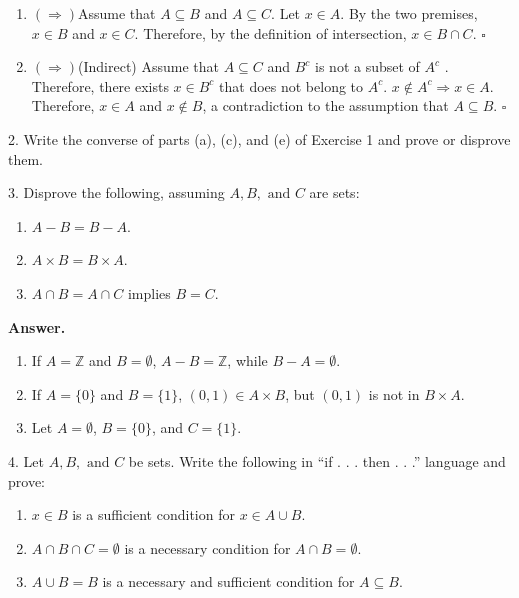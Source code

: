 \documentclass[10pt,]{book}
\theoremstyle{plain}
\theoremstyle{definition}
\theoremstyle{definition}
\theoremstyle{definition}
\begin{document}
\begin{exercisegroup}
\begin{enumerate}[label=\alph*]
\item\hypertarget{li-12}{}\((\Rightarrow )\)Assume that \(A \subseteq  B\) and \(A \subseteq  C\). Let \(x\in A\). By the two premises,\(x\in B\) and \(x\in C\). Therefore, by the      definition of intersection, \(x\in B\cap C\). \(\square\)%
\item\hypertarget{li-13}{} \((\Rightarrow )\)(Indirect) Assume that \(A\subseteq C\) and \(B^c\) is not a subset of \(A^c\) . Therefore, there exists \(x\in B^c\) that does not  belong to \(A^c\). \(x \notin  A^c \Rightarrow  x \in  A\). Therefore, \(x\in A\) and \(x\notin B\), a contradiction to the assumption that \(A\subseteq B\). \(\square\)%
\end{enumerate}
%
\item[2.]\hypertarget{exercise-2}{}Write the converse of parts (a), (c), and (e) of Exercise 1 and prove or disprove them.%
\par\smallskip
\item[3.]\hypertarget{exercise-3}{}  Disprove the following, assuming \(A, B, \textrm{ and } C\) are sets:%
\par
\leavevmode%
\begin{enumerate}[label=\alph*]
\item\hypertarget{li-14}{}\(A - B = B - A\).%
\item\hypertarget{li-15}{}\(A\times B = B\times A\).%
\item\hypertarget{li-16}{}\(A \cap   B = A  \cap   C\) implies \(B = C\).%
\end{enumerate}
%
\par\smallskip
\par\smallskip
\noindent\textbf{Answer.}\hypertarget{answer-2}{}\quad
\leavevmode%
\begin{enumerate}[label=\alph*]
\item\hypertarget{li-17}{} If \(A = \mathbb{Z}\) and \(B=\emptyset\), \(A - B = \pmb{\mathbb{Z}}\), while \(B - A = \emptyset\).%
\item\hypertarget{li-18}{} If \(A=\{0\}\) and \(B = \{1\}\), \((0,1) \in  A \times  B\), but \((0, 1)\) is not in \(B\times A\).%
\item\hypertarget{li-19}{}Let \(A = \emptyset\), \(B = \{0\}\), and \(C = \{1\}\). %
\end{enumerate}
%
\item[4.]\hypertarget{exercise-4}{}  Let \(A, B, \textrm{ and } C\) be sets. Write the following in ``if . . . then . . .'' language and prove:%
\par
\leavevmode%
\begin{enumerate}[label=\alph*]
\item\hypertarget{li-20}{}\(x \in  B\) is a sufficient condition for \(x \in  A \cup B\).%
\item\hypertarget{li-21}{}\(A \cap B\cap C = \emptyset\) is a necessary condition for \(A \cap  B =\emptyset\).%
\item\hypertarget{li-22}{}\(A \cup  B = B\) is a necessary and sufficient condition for \(A\subseteq  B\).%
\end{enumerate}
%
\par\smallskip
\end{exercisegroup}
\end{document}
